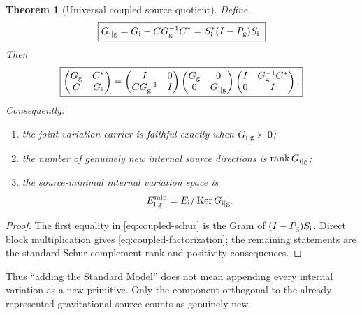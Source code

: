 \documentclass[11pt]{article}
\newtheorem{theorem}{Theorem}[section]
\theoremstyle{definition}
\theoremstyle{remark}
\newcommand{\rank}{\operatorname{rank}}
\newcommand{\Ker}{\operatorname{Ker}}
\begin{document}
\begin{theorem}[Universal coupled source quotient]
\label{thm:coupled-schur}
Define
\begin{equation}
\boxed{
G_{{\rm i}\mid{\rm g}}
=
G_{\rm i}-CG_{\rm g}^{-1}C^*
=
S_{\rm i}^*(I-P_{\rm g})S_{\rm i}.}
\label{eq:coupled-schur}
\end{equation}
Then
\begin{equation}
\boxed{
\begin{pmatrix}
G_{\rm g}&C^*\\
C&G_{\rm i}
\end{pmatrix}
=
\begin{pmatrix}
I&0\\
CG_{\rm g}^{-1}&I
\end{pmatrix}
\begin{pmatrix}
G_{\rm g}&0\\
0&G_{{\rm i}\mid{\rm g}}
\end{pmatrix}
\begin{pmatrix}
I&G_{\rm g}^{-1}C^*\\
0&I
\end{pmatrix}.}
\label{eq:coupled-factorization}
\end{equation}
Consequently:
\begin{enumerate}[label=\textup{(\roman*)},leftmargin=2.8em]
\item the joint variation carrier is faithful exactly when
      $G_{{\rm i}\mid{\rm g}}\succ0$;
\item the number of genuinely new internal source directions is
      $\rank G_{{\rm i}\mid{\rm g}}$;
\item the source-minimal internal variation space is
      \[
      E_{{\rm i}\mid{\rm g}}^{\min}
      =
      E_{\rm i}/\Ker G_{{\rm i}\mid{\rm g}}.
      \]
\end{enumerate}
\end{theorem}

\begin{proof}
The first equality in \eqref{eq:coupled-schur} is the Gram of
$(I-P_{\rm g})S_{\rm i}$.  Direct block multiplication gives
\eqref{eq:coupled-factorization}; the remaining statements are the standard
Schur-complement rank and positivity consequences.
\end{proof}

Thus ``adding the Standard Model'' does not mean appending every internal
variation as a new primitive.  Only the component orthogonal to the already
represented gravitational source counts as genuinely new.
\end{document}

